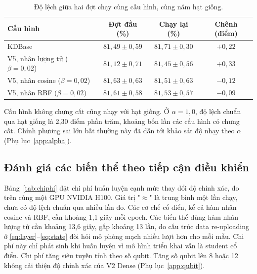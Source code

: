\begin{table}[!htbp]
\centering
\caption{Độ lệch giữa hai đợt chạy cùng cấu hình, cùng năm hạt giống.}
\label{tab:taplap}
\begin{tabular}{lccc}
\toprule
\textbf{Cấu hình} & \textbf{Đợt đầu (\%)} & \textbf{Chạy lại (\%)} & \textbf{Chênh (điểm)} \\
\midrule
KDBase & $81{,}49 \pm 0{,}59$ & $81{,}71 \pm 0{,}30$ & $+0{,}22$ \\
V5, nhân lượng tử ($\beta = 0{,}02$) & $81{,}12 \pm 0{,}71$ & $81{,}45 \pm 0{,}56$ & $+0{,}33$ \\
V5, nhân cosine ($\beta = 0{,}02$) & $81{,}63 \pm 0{,}63$ & $81{,}51 \pm 0{,}63$ & $-0{,}12$ \\
V5, nhân RBF ($\beta = 0{,}02$) & $81{,}61 \pm 0{,}58$ & $81{,}53 \pm 0{,}57$ & $-0{,}09$ \\
\bottomrule
\end{tabular}
\end{table}
\FloatBarrier

Cấu hình không chưng cất cũng nhạy với hạt giống. Ở $\alpha = 1{,}0$, độ
lệch chuẩn qua hạt giống là 2,30 điểm phần trăm, khoảng bốn lần các cấu
hình có chưng cất. Chính phương sai lớn bất thường này đã dẫn tới khảo sát
độ nhạy theo $\alpha$ (Phụ lục~\ref{app:alpha}).

\subsection{Đánh giá các biến thể theo tiếp cận điều khiển}
\label{sec:danhgiadk}

Bảng~\ref{tab:chiphi} đặt chi phí huấn luyện cạnh mức thay đổi độ chính
xác, đo trên cùng một GPU NVIDIA H100. Giá trị "$\approx$" là trung bình
một lần chạy, chưa có độ lệch chuẩn qua nhiều lần đo. Các cơ chế cổ điển,
kể cả hàm nhân cosine và RBF, cần khoảng 1,1 giây mỗi epoch. Các biến thể
dùng hàm nhân lượng tử cần khoảng 13,6 giây, gấp khoảng 13 lần, do cấu
trúc data re-uploading ở \eqref{eq:layer}--\eqref{eq:state} đòi hỏi mô
phỏng mạch nhiều lượt hơn cho mỗi mẫu. Chi phí này chỉ phát sinh khi huấn
luyện vì mô hình triển khai vẫn là student cổ điển. Chi phí tăng siêu tuyến
tính theo số qubit. Tăng số qubit lên 8 hoặc 12 không cải thiện độ
chính xác của V2 Dense (Phụ lục~\ref{app:qubit}).

